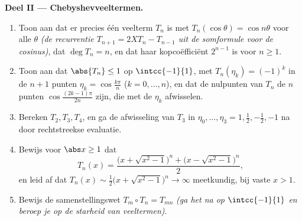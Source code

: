 \begin{problem}
\medskip
\noindent\textbf{Deel II --- Chebyshevveeltermen.}
\begin{enumerate}[resume]
  \item Toon aan dat er precies één veelterm $T_n$ is met
        $T_n(\cos\theta) = \cos n\theta$ voor alle $\theta$
        \emph{(de recurrentie $T_{n+1} = 2XT_n - T_{n-1}$ uit de
        somformule voor de cosinus)}, dat $\deg T_n = n$, en dat
        haar kopcoëfficiënt $2^{n-1}$ is voor $n \geq 1$.
  \item Toon aan dat $\abs{T_n} \leq 1$ op $\intcc{-1}{1}$, met
        $T_n(\eta_k) = (-1)^k$ in de $n + 1$ punten $\eta_k =
        \cos\frac{k\pi}{n}$ ($k = 0, \dots, n$), en dat de
        nulpunten van $T_n$ de $n$ punten
        $\cos\frac{(2k-1)\pi}{2n}$ zijn, die met de $\eta_k$
        afwisselen.
  \item Bereken $T_2, T_3, T_4$, en ga de afwisseling van $T_3$ in
        $\eta_0, \dots, \eta_3 = 1, \frac12, -\frac12, -1$ na door
        rechtstreekse evaluatie.
  \item Bewijs voor $\abs x \geq 1$ dat
        \[
        T_n(x) = \frac{\bigl(x + \sqrt{x^2 - 1}\bigr)^n +
        \bigl(x - \sqrt{x^2 - 1}\bigr)^n}{2},
        \]
        en leid af dat $T_n(x) \sim \frac12\bigl(x + \sqrt{x^2 -
        1}\bigr)^n \to \infty$ meetkundig, bij vaste $x > 1$.
  \item Bewijs de samenstellingswet $T_m \circ T_n = T_{mn}$
        \emph{(ga het na op $\intcc{-1}{1}$ en beroep je op de
        starheid van veeltermen)}.
\end{enumerate}


\end{problem}
